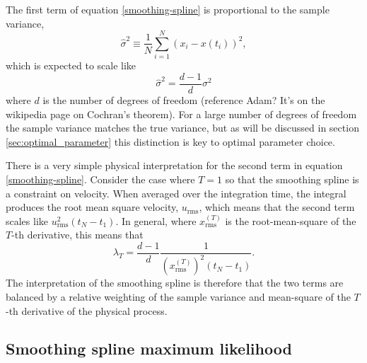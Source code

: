 \documentclass[10pt,journal]{IEEEtran}
\begin{document}
The first term of equation \ref{smoothing-spline} is proportional to the sample variance,
\begin{equation}
\label{sample_variance}
\hat{\sigma}^2  \equiv \frac{1}{N} \sum_{i=1}^{N} \left( x_i - x(t_i) \right) ^2,
\end{equation}
which is expected to scale like
\begin{equation}
\label{sample_variance_variance}
\hat{\sigma}^2 = \frac{d-1}{d} \sigma^2
\end{equation}
where $d$ is the number of degrees of freedom (reference Adam? It's on the wikipedia page on Cochran's theorem). For a large number of degrees of freedom the sample variance matches the true variance, but as will be discussed in section \ref{sec:optimal_parameter} this distinction is key to optimal parameter choice.

There is a very simple physical interpretation for the second term in equation \ref{smoothing-spline}. Consider the case where $T=1$ so that the smoothing spline is a constraint on velocity. When averaged over the integration time, the integral produces the root mean square velocity, $u_{\textrm{rms}}$, which means that the second term scales like $u_{\textrm{rms}}^2 (t_N-t_1)$. In general, where $x^{(T)}_{\textrm{rms}}$ is the root-mean-square of the $T$-th derivative, this means that
\begin{equation}
\label{lambda}
\lambda_T = \frac{d-1}{d} \frac{1}{ \left(x^{(T)}_{\textrm{rms}}\right)^2 (t_N-t_1)}.
\end{equation}
The interpretation of the smoothing spline is therefore that the two terms are balanced by a relative weighting of the sample variance and mean-square of the $T$-th derivative of the physical process.



\subsection{Smoothing spline maximum likelihood}
\end{document}
